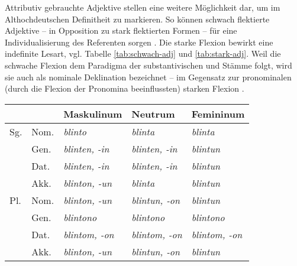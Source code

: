 Attributiv gebrauchte Adjektive stellen eine weitere Möglichkeit dar, um im Althochdeutschen Definitheit zu markieren. So können schwach flektierte Adjektive -- in Opposition zu stark flektierten Formen -- für eine Individualisierung des Referenten sorgen \parencite[68]{Szczepaniak2011a}. Die starke Flexion bewirkt eine indefinite Lesart, vgl. Tabelle \ref{tab:schwach-adj} und \ref{tab:stark-adj}.  Weil die schwache Flexion dem Paradigma der substantivischen  und Stämme folgt, wird sie auch als nominale Deklination bezeichnet -- im Gegensatz zur pronominalen  (durch die Flexion der Pronomina beeinflussten) starken Flexion \parencite[s.][251]{Meineke2001}. 

\begin{table}

\begin{tabular}{lllll}
\lsptoprule
                  &               & \multicolumn{1}{l}{{Maskulinum}}  & \multicolumn{1}{l}{{Neutrum}}     & \multicolumn{1}{l}{{Femininum}}       \\ \midrule
{Sg.} & {Nom.} & \textit{blinto}                          & \textit{blinta}                          & \textit{blinta}                              \\
                  & {Gen.} & \textit{blinten, -in}                    & \textit{blinten, -in}                    & \textit{blintun}                             \\
                  & {Dat.} & \textit{blinten, -in}                    & \textit{blinten, -in}                    & \textit{blintun}                             \\
                  & {Akk.} & \textit{blinton, -un}                    & \textit{blinta}                          & \textit{blintun}                             \\
{Pl.}   & {Nom.} & \textit{blinton, -un}                    & \textit{blintun, -on}                    & \textit{blintun}                             \\
                  & {Gen.} & \textit{blintono}                        & \textit{blintono}                        & \textit{blintono}                            \\
                  & {Dat.} & \textit{blintom, -on}                    & \textit{blintom, -on}                    & \textit{blintom, -on}                        \\
                  & {Akk.} & \textit{blinton, -un}                    & \textit{blintun, -on}                    & \textit{blintun}                             \\\midrule

\end{tabular}
\end{table}
